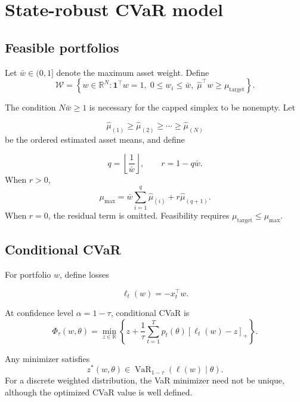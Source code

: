 \documentclass[11pt,a4paper]{article}
\theoremstyle{definition}
\theoremstyle{remark}
\newcommand{\R}{\mathbb{R}}
\newcommand{\W}{\mathcal{W}}
\newcommand{\VaR}{\operatorname{VaR}}
\begin{document}
\section{State-robust CVaR model}

\subsection{Feasible portfolios}

Let \(\bar w\in(0,1]\) denote the maximum asset weight. Define
\begin{equation}
\W
=
\left\{
w\in\R^N:
\mathbf1^\top w=1,\;
0\le w_i\le\bar w,\;
\widehat\mu^\top w\ge\mu_{\mathrm{target}}
\right\}.
\label{eq:portfolio-set}
\end{equation}

The condition \(N\bar w\ge1\) is necessary for the capped simplex to be
nonempty. Let

\[
\widehat\mu_{(1)}
\ge
\widehat\mu_{(2)}
\ge\cdots\ge
\widehat\mu_{(N)}
\]
be the ordered estimated asset means, and define

\[
q=\left\lfloor\frac1{\bar w}\right\rfloor,
\qquad
r=1-q\bar w.
\]
When \(r>0\),
\begin{equation}
\mu_{\max}
=
\bar w\sum_{i=1}^{q}\widehat\mu_{(i)}
+
r\widehat\mu_{(q+1)}.
\label{eq:max-feasible-return}
\end{equation}
When \(r=0\), the residual term is omitted. Feasibility requires
\(\mu_{\mathrm{target}}\le\mu_{\max}\).

\subsection{Conditional CVaR}

For portfolio \(w\), define losses

\[
\ell_t(w)=-x_t^\top w.
\]

At confidence level \(\alpha=1-\tau\), conditional CVaR is
\begin{equation}
\Phi_\tau(w,\theta)
=
\min_{z\in\R}
\left\{
z+
\frac1{\tau}
\sum_{t=1}^{T}
p_t(\theta)[\ell_t(w)-z]_+
\right\}.
\label{eq:conditional-cvar}
\end{equation}

Any minimizer satisfies
\begin{equation}
z^*(w,\theta)
\in
\VaR_{1-\tau}(\ell(w)\mid\theta).
\label{eq:var-level}
\end{equation}
For a discrete weighted distribution, the VaR minimizer need not be unique,
although the optimized CVaR value is well defined.
\end{document}
